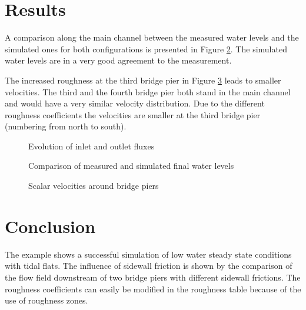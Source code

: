 \section{Results}
A comparison along the main channel between the measured water levels and the
simulated ones for both configurations is presented in Figure
\ref{t2d:donau:diff_waterlevels}.
The simulated water levels are in a very good agreement to the measurement.

The increased roughness at the third bridge pier in Figure
\ref{t2d:donau:final_flow} leads to smaller velocities.
The third and the fourth bridge pier both stand in the main channel and would
have a very similar velocity distribution.
Due to the different roughness coefficients the velocities are smaller
at the third bridge pier (numbering from north to south).

\begin{figure} [h!]
\centering
{}
\caption{Evolution of inlet and outlet fluxes}
\label{t2d:donau:fluxes}
\end{figure}


\begin{figure} [h!]
\centering
{}
\caption{Comparison of measured and simulated final water levels}
\label{t2d:donau:diff_waterlevels}
\end{figure}

\begin{figure} [h!]
\centering
{}
\caption{Scalar velocities around bridge piers}
\label{t2d:donau:final_flow}
\end{figure}

\section{Conclusion}
The example shows a successful simulation of low water steady state conditions
with tidal flats.
The influence of sidewall friction is shown by the comparison of the flow field
downstream of two bridge piers with different sidewall frictions.
The roughness coefficients can easily be modified in the roughness table because
of the use of roughness zones.



